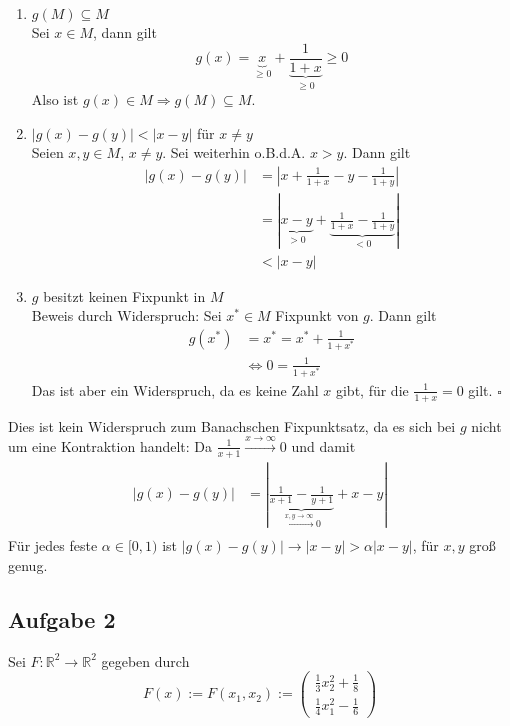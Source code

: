 \documentclass[11pt,a4paper,ngerman]{article}
\begin{document}
\begin{enumerate}
\item $g(M) \subseteq M$\\
  Sei $x \in M$, dann gilt 
  \begin{equation*}
    g(x) = \underbrace{x}_{\geq 0} + \underbrace{\frac{1}{1+x}}_{\geq 0} \geq 0
  \end{equation*}
  Also ist $g(x) \in M \Rightarrow g(M) \subseteq M$.
\item $|g(x) - g(y)| < |x-y|$ für $x \neq y$\\
  Seien $x,y \in M$, $x \neq y$. Sei weiterhin o.B.d.A. $x > y$. Dann gilt
  \begin{equation*}\begin{split}
    |g(x) - g(y)| &= |x + \frac{1}{1+x} - y - \frac{1}{1+y}|\\
                  &= |\underbrace{x - y}_{> 0} + \underbrace{\frac{1}{1+x} - \frac{1}{1+y}}_{< 0}| \\
                  &< |x - y|
  \end{split}\end{equation*}
\item $g$ besitzt keinen Fixpunkt in $M$\\
  Beweis durch Widerspruch: Sei $x^* \in M$ Fixpunkt von $g$. Dann gilt
  \begin{equation*}\begin{split}
    g(x^*) &= x^* = x^* + \frac{1}{1+ x^*}\\
    &\Leftrightarrow 0 = \frac{1}{1 + x^*}
  \end{split}\end{equation*}
  Das ist aber ein Widerspruch, da es keine Zahl $x$ gibt, für die $\frac{1}{1+x} = 0$ gilt.
  \mbox{} \hfill $\square$
\end{enumerate}
Dies ist kein Widerspruch zum Banachschen Fixpunktsatz, da es sich bei $g$ nicht um eine
Kontraktion handelt: Da $\frac{1}{x+1} \stackrel{x \to \infty}{\to} 0$ und damit
\begin{equation*}\begin{split}
|g(x) - g(y)| &= |\underbrace{\frac{1}{x+1} - \frac{1}{y+1}}_{\stackrel{x,y \to \infty}{\to} 0}  + x- y| \\
\end{split}\end{equation*} 
Für jedes feste $\alpha \in [0,1)$ ist $|g(x) - g(y)| \to |x-y| > \alpha|x-y|$, für $x,y$ groß genug.

\subsection*{Aufgabe 2}
Sei $F: \mathbb{R}^2 \to \mathbb{R}^2$ gegeben durch 
$$ F(x) := F(x_1,x_2) := \left(\begin{array}{c}
\frac{1}{3}x_2^2+\frac{1}{8}\\
\frac{1}{4}x_1^2-\frac{1}{6}\end{array} \right)$$
\end{document}
